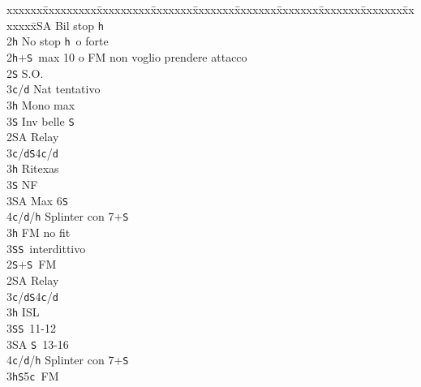 \documentclass[a4paper,italian]{article}
\newcommand{\BS}{\small{\texttt{S}}}
\newcommand{\BC}{\small{\texttt{c}}}
\newcommand{\BD}{\small{\texttt{d}}}
\newcommand{\BH}{\small{\texttt{h}}}
\newenvironment{bidtable}
{\begin{tabbing}

    xxxxxx\=xxxxxxxxx\=xxxxxxxxx\=xxxxxxx\=xxxxxxx\=xxxxxxx\=xxxxxxx\=xxxxxxx\=xxxxxxx\=xxxxxxx\=\kill}
{\end{tabbing} }%
\begin{document}
\begin{multicols*}{2}
\begin{bidtable}
        2\small{SA} \> Bil stop \BH \\
        2\BH \> No stop \BH\ o forte\-\\
        2\BH {}+\BS\ max 10 o FM non voglio prendere attacco\+\\
        2\BS \> S.O.\+\\
        3\BC/\BD \> Nat tentativo\\
        3\BH \> Mono max\\
        3\BS \> Inv belle \BS \-\\
        2\small{SA} \> Relay\+\\
        3\BC/\BD {}\BS 4\BC /\BD \\
        3\BH \> Ritexas\+\\
        3\BS \> NF\-\\
        3\small{SA} \> Max 6\BS \\
        4\BC/\BD/\BH \> Splinter con 7+\BS \-\\
        3\BH \> FM no fit\\
        3\BS {}\BS\ interdittivo\-\\
        2\BS {}+\BS\ FM\+\\
        2\small{SA} \> Relay\+\\
        3\BC/\BD {}\BS 4\BC /\BD \\
        3\BH \> ISL\\
        3\BS {}\BS\ 11-12\\
        3\small{SA} \BS\ 13-16\\
        4\BC/\BD/\BH \> Splinter con 7+\BS \-\-\\
        3\BH {}\BS 5\BC\ FM
    \end{bidtable}

    \vfill
    \parbox{\textwidth}{}

    \columnbreak


\end{multicols*}
\end{document}
